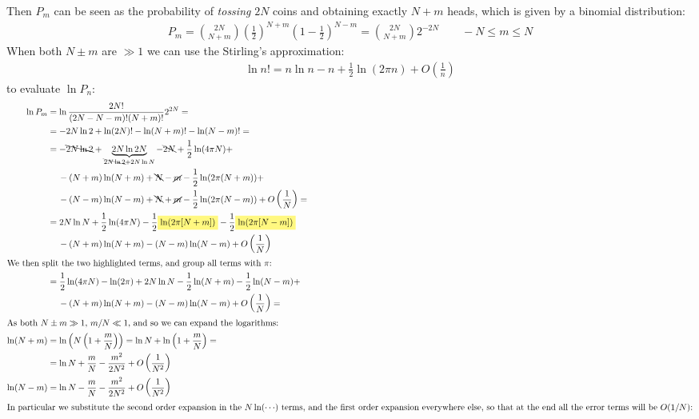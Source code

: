 \documentclass[../template.tex]{subfiles}
\begin{document}
Then $P_m$ can be seen as the probability of \textit{tossing} $2N$ coins and obtaining exactly $N+m$ heads, which is given by a binomial distribution:
\begin{align}\label{eqn:m-binomial}
    P_m = {2N \choose N+m} \left(\frac{1}{2} \right)^{N+m} \left(1-\frac{1}{2} \right)^{N-m} = {2N \choose N+m} 2^{-2N} \qquad -N \leq m \leq N 
\end{align}  
 When both $N\pm m$ are $\gg 1$ we can use the Stirling's approximation:
\begin{align}\label{eqn:stirling1}
    \ln n! = n \ln n - n  +\frac{1}{2} \ln (2 \pi n)  + O\left(\frac{1}{n} \right)
\end{align}
to evaluate $\ln P_n$:
\begin{align*}
    \ln P_m &= \ln \frac{2N!}{(2N-N-m)!(N+m)!} 2^{2N} =\\ 
    &= - 2N \ln 2 + \ln (2N)! - \ln (N+m)! - \ln (N-m)! = \\
    &= -\bcancel{2N \ln 2} + \underbrace{2 N \ln 2N}_{\bcancel{2 N \ln 2} + 2N\ln N} -\bcancel{ 2N} + \frac{1}{2} \ln(4 \pi N) +\\
    &\quad \> -(N+m)\ln(N+m) + \bcancel{N}-\cancel{m} - \frac{1}{2}\ln(2\pi(N+m)) + \\
    &\quad \> -(N-m) \ln(N-m) +\bcancel{N}+\cancel{m} - \frac{1}{2} \ln(2\pi(N-m)) + O\left(\frac{1}{N} \right)= \\
    &= 2 N \ln N + \frac{1}{2} \ln(4 \pi N) - \frac{1}{2} \hlc{Yellow}{\ln(2\pi[N+m])} - \frac{1}{2} \hlc{Yellow}{\ln(2\pi[N-m])}   \\
    &\quad \> -(N+m) \ln (N+m) - (N-m) \ln(N-m) + O\left(\frac{1}{N} \right)\\
\shortintertext{We then split the two highlighted terms, and group all terms with $\pi$:}
    &=\frac{1}{2} \ln(4 \pi N) - \ln(2 \pi) + 2 N \ln N - \frac{1}{2} \ln(N+m) -\frac{1}{2}\ln(N-m)+\\
    &\quad \> -(N+m)\ln(N+m) - (N-m) \ln(N-m) + O\left(\frac{1}{N} \right) =\\    
\shortintertext{As both $N \pm m \gg 1$, $m/N \ll 1$, and so we can expand the logarithms:}
\ln(N+m) &= \ln \left(N\left(1 + \frac{m}{N} \right)\right) = \ln N + \ln \left(1+\frac{m}{N} \right) =\\
&= \ln N +\frac{m}{N}-\frac{m^2}{2N^2} + O\left(\frac{1}{N^2} \right) \\
\ln(N-m) &= \ln N -\frac{m}{N} -\frac{m^2}{2N^2} + O\left(\frac{1}{N^2} \right)  \\
\shortintertext{In particular we substitute the second order expansion in the $N \ln(\cdots)$ terms, and the first order expansion everywhere else, so that at the end all the error terms will be $O(1/N)$:}

\end{align*}
\end{document}
